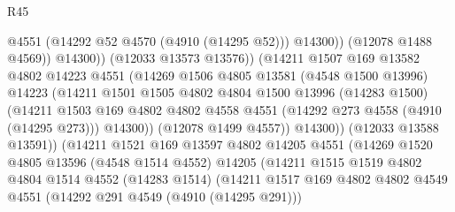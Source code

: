 \begin{lexlean}{R45}
\begin{coremodule}
                                      @4551
                                      (@14292 @52 @4570 (@4910 (@14295 @52)))
                                      @14300))
                                  (@12078 @1488 @4569))
                                @14300))
                            (@12033 @13573 @13576))
                          (@14211
                            @1507
                            @169
                            @13582
                            @4802
                            @14223
                            @4551
                            (@14269
                              @1506
                              @4805
                              @13581
                              (@4548 @1500 @13996)
                              @14223
                              (@14211
                                @1501
                                @1505
                                @4802
                                @4804
                                @1500
                                @13996
                                (@14283 @1500)
                                (@14211
                                  @1503
                                  @169
                                  @4802
                                  @4802
                                  @4558
                                  @4551
                                  (@14292 @273 @4558 (@4910 (@14295 @273)))
                                  @14300))
                              (@12078 @1499 @4557))
                            @14300))
                        (@12033 @13588 @13591))
                      (@14211
                        @1521
                        @169
                        @13597
                        @4802
                        @14205
                        @4551
                        (@14269
                          @1520
                          @4805
                          @13596
                          (@4548 @1514 @4552)
                          @14205
                          (@14211
                            @1515
                            @1519
                            @4802
                            @4804
                            @1514
                            @4552
                            (@14283 @1514)
                            (@14211
                              @1517
                              @169
                              @4802
                              @4802
                              @4549
                              @4551
                              (@14292 @291 @4549 (@4910 (@14295 @291)))

\end{coremodule}
\end{lexlean}
